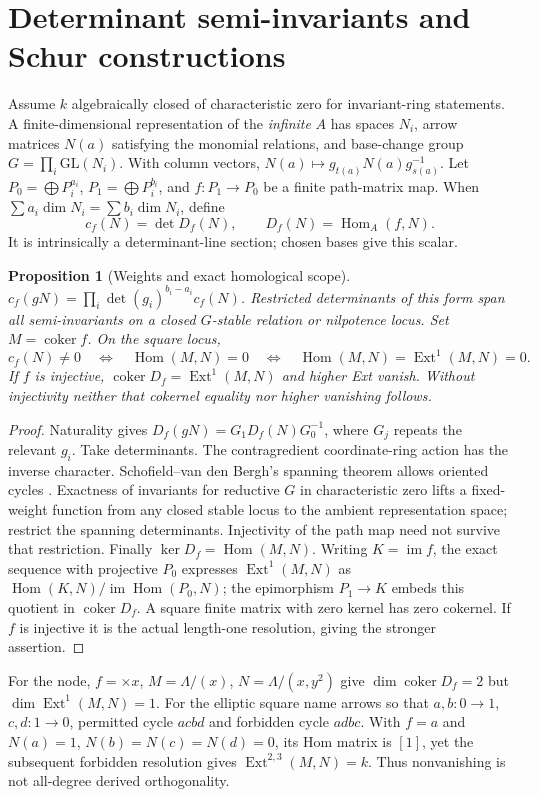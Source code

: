 \documentclass[11pt]{article}
\newtheorem{proposition}[theorem]{Proposition}
\theoremstyle{definition}\newtheorem{definition}[theorem]{Definition}
\theoremstyle{remark}\newtheorem{remark}[theorem]{Remark}
\begin{document}
\section{Determinant semi-invariants and Schur constructions}
Assume $k$ algebraically closed of characteristic zero for invariant-ring statements. A finite-dimensional representation of the \emph{infinite} $A$ has spaces $N_i$, arrow matrices $N(a)$ satisfying the monomial relations, and base-change group $G=\prod_i\mathrm{GL}(N_i)$. With column vectors, $N(a)\mapsto g_{t(a)}N(a)g_{s(a)}^{-1}$. Let $P_0=\bigoplus P_i^{a_i}$, $P_1=\bigoplus P_i^{b_i}$, and $f:P_1\to P_0$ be a finite path-matrix map. When $\sum a_i\dim N_i=\sum b_i\dim N_i$, define
\[
 c_f(N)=\det D_f(N),\qquad D_f(N)=\operatorname{Hom}_A(f,N).
\]
It is intrinsically a determinant-line section; chosen bases give this scalar.
\begin{proposition}[Weights and exact homological scope]\label{thm:semi}
$c_f(gN)=\prod_i\det(g_i)^{b_i-a_i}c_f(N)$. Restricted determinants of this form span all semi-invariants on a closed $G$-stable relation or nilpotence locus. Set $M=\operatorname{coker}f$. On the square locus,
\[
 c_f(N)\ne0\quad\Longleftrightarrow\quad\operatorname{Hom}(M,N)=0
 \quad\Longleftrightarrow\quad\operatorname{Hom}(M,N)=\operatorname{Ext}^1(M,N)=0.
\]
If $f$ is injective, $\operatorname{coker}D_f=\operatorname{Ext}^1(M,N)$ and higher Ext vanish. Without injectivity neither that cokernel equality nor higher vanishing follows.
\end{proposition}
\begin{proof}
Naturality gives $D_f(gN)=G_1D_f(N)G_0^{-1}$, where $G_j$ repeats the relevant $g_i$. Take determinants. The contragredient coordinate-ring action has the inverse character. Schofield--van den Bergh's spanning theorem allows oriented cycles \cite[Theorem2.3]{SchofieldVdB}. Exactness of invariants for reductive $G$ in characteristic zero lifts a fixed-weight function from any closed stable locus to the ambient representation space; restrict the spanning determinants. Injectivity of the path map need not survive that restriction. Finally $\ker D_f=\operatorname{Hom}(M,N)$. Writing $K=\operatorname{im}f$, the exact sequence with projective $P_0$ expresses $\operatorname{Ext}^1(M,N)$ as $\operatorname{Hom}(K,N)/\operatorname{im}\operatorname{Hom}(P_0,N)$; the epimorphism $P_1\to K$ embeds this quotient in $\operatorname{coker}D_f$. A square finite matrix with zero kernel has zero cokernel. If $f$ is injective it is the actual length-one resolution, giving the stronger assertion.
\end{proof}
For the node, $f=\times x$, $M=\Lambda/(x)$, $N=\Lambda/(x,y^2)$ give $\dim\operatorname{coker}D_f=2$ but $\dim\operatorname{Ext}^1(M,N)=1$. For the elliptic square name arrows so that $a,b:0\to1$, $c,d:1\to0$, permitted cycle $acbd$ and forbidden cycle $adbc$. With $f=a$ and $N(a)=1$, $N(b)=N(c)=N(d)=0$, its Hom matrix is $[1]$, yet the subsequent forbidden resolution gives $\operatorname{Ext}^{2,3}(M,N)=k$. Thus nonvanishing is not all-degree derived orthogonality.
\end{document}
